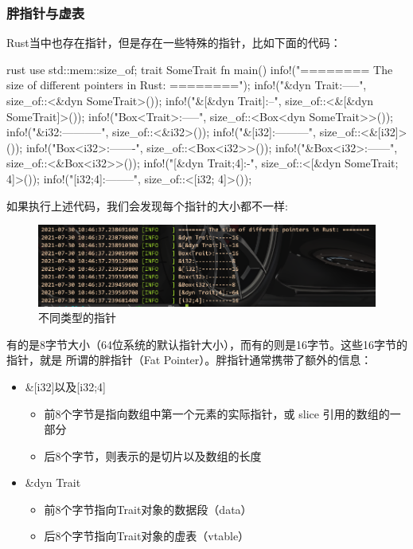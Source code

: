 \subsubsection{胖指针与虚表}
Rust当中也存在指针，但是存在一些特殊的指针，比如下面的代码：
\begin{code-block}{rust}
use std::mem::size_of;
trait SomeTrait {}
fn main() {
    info!("======== The size of different pointers in Rust: ========");
    info!("&dyn Trait:-----{}", size_of::<&dyn SomeTrait>());
    info!("&[&dyn Trait]:--{}", size_of::<&[&dyn SomeTrait]>());
    info!("Box<Trait>:-----{}", size_of::<Box<dyn SomeTrait>>());
    info!("&i32:-----------{}", size_of::<&i32>());
    info!("&[i32]:---------{}", size_of::<&[i32]>());
    info!("Box<i32>:-------{}", size_of::<Box<i32>>());
    info!("&Box<i32>:------{}", size_of::<&Box<i32>>());
    info!("[&dyn Trait;4]:-{}", size_of::<[&dyn SomeTrait; 4]>());
    info!("[i32;4]:--------{}", size_of::<[i32; 4]>());
}
\end{code-block}
如果执行上述代码，我们会发现每个指针的大小都不一样:
\begin{figure}[H]
  \centering
  \includegraphics[width=\linewidth]{fat_pointer.png}
  \caption{不同类型的指针}
  \label{fig:fat_pointer}
\end{figure}
有的是8字节大小（64位系统的默认指针大小），而有的则是16字节。这些16字节的指针，就是
所谓的胖指针（Fat Pointer）。胖指针通常携带了额外的信息：
\begin{itemize}
  \item \&[i32]以及[i32;4]
  \begin{itemize}
    \item 前8个字节是指向数组中第一个元素的实际指针，或 slice 引用的数组的一部分
    \item 后8个字节，则表示的是切片以及数组的长度
  \end{itemize}
  \item \&dyn Trait
  \begin{itemize}
    \item 前8个字节指向Trait对象的数据段（data）
    \item 后8个字节指向Trait对象的虚表（vtable）
  \end{itemize}
\end{itemize}
